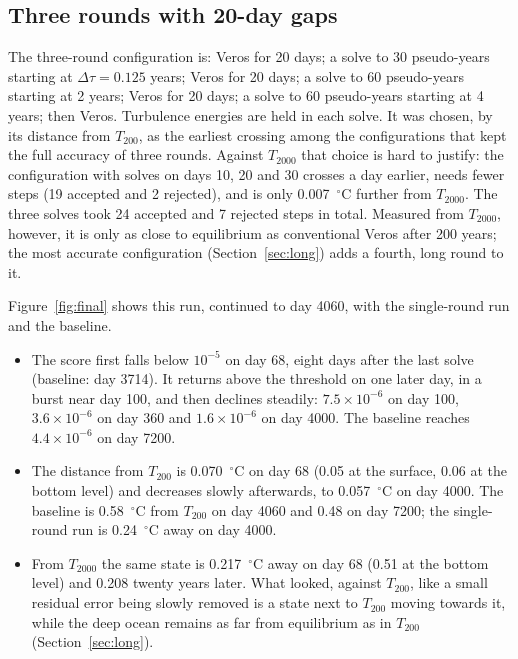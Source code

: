 \documentclass{article}
\begin{document}
\subsection{Three rounds with 20-day gaps}\label{sec:final}

The three-round configuration is: Veros for 20 days; a solve to 30 pseudo-years starting at $\Delta\tau=0.125$ years; Veros for 20 days; a solve to 60 pseudo-years starting at 2 years; Veros for 20 days; a solve to 60 pseudo-years starting at 4 years; then Veros. Turbulence energies are held in each solve. It was chosen, by its distance from $T_{200}$, as the earliest crossing among the configurations that kept the full accuracy of three rounds. Against $T_{2000}$ that choice is hard to justify: the configuration with solves on days 10, 20 and 30 crosses a day earlier, needs fewer steps (19 accepted and 2 rejected), and is only 0.007~$^\circ$C further from $T_{2000}$. The three solves took 24 accepted and 7 rejected steps in total. Measured from $T_{2000}$, however, it is only as close to equilibrium as conventional Veros after 200 years; the most accurate configuration (Section~\ref{sec:long}) adds a fourth, long round to it.

Figure~\ref{fig:final} shows this run, continued to day 4060, with the single-round run and the baseline.
\begin{itemize}
\item The score first falls below $10^{-5}$ on day 68, eight days after the last solve (baseline: day 3714). It returns above the threshold on one later day, in a burst near day 100, and then declines steadily: $7.5\times10^{-6}$ on day 100, $3.6\times10^{-6}$ on day 360 and $1.6\times10^{-6}$ on day 4000. The baseline reaches $4.4\times10^{-6}$ on day 7200.
\item The distance from $T_{200}$ is 0.070~$^\circ$C on day 68 (0.05 at the surface, 0.06 at the bottom level) and decreases slowly afterwards, to 0.057~$^\circ$C on day 4000. The baseline is 0.58~$^\circ$C from $T_{200}$ on day 4060 and 0.48 on day 7200; the single-round run is 0.24~$^\circ$C away on day 4000.
\item From $T_{2000}$ the same state is 0.217~$^\circ$C away on day 68 (0.51 at the bottom level) and 0.208 twenty years later. What looked, against $T_{200}$, like a small residual error being slowly removed is a state next to $T_{200}$ moving towards it, while the deep ocean remains as far from equilibrium as in $T_{200}$ (Section~\ref{sec:long}).
\end{itemize}
\end{document}
